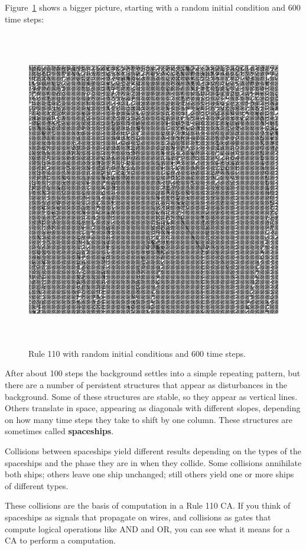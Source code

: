\documentclass[10pt]{book}
\begin{document}
Figure~\ref{rule110} shows a bigger picture, starting with a random
initial condition and 600 time steps:

\begin{figure}
\centerline{\includegraphics[width=5.5in,height=5.5in]{figs/rule-110-600-random.pdf}}
\caption{Rule 110 with random initial conditions and 600 time steps.\label{rule110}}
\end{figure}

After about 100 steps the background settles into a simple repeating
pattern, but there are a number of persistent structures that appear
as disturbances in the background.  Some of these structures
are stable, so they appear as vertical lines.  Others translate in
space, appearing as diagonals with different slopes, depending on
how many time steps they take to shift by one column.  These
structures are sometimes called {\bf spaceships}.

Collisions between spaceships yield different results
depending on the types of the spaceships and the phase they are in
when they collide.  Some collisions annihilate both ships; others
leave one ship unchanged; still others yield one or more ships of
different types.

These collisions are the basis of computation in a Rule 110 CA.  If
you think of spaceships as signals that propagate on wires, and
collisions as gates that compute logical operations like AND and OR,
you can see what it means for a CA to perform a computation.
\end{document}
